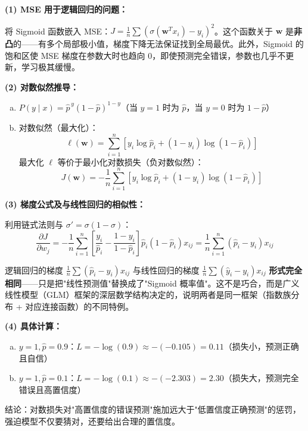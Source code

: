 \documentclass[a4paper,11pt]{ctexart}
\begin{document}
\begin{solutionbox}[参考答案与详细解析]
    \textbf{(1) MSE 用于逻辑回归的问题：}

    将 Sigmoid 函数嵌入 MSE：$J = \frac{1}{n}\sum(\sigma(\boldsymbol{w}^Tx_i)-y_i)^2$。这个函数关于 $\boldsymbol{w}$ 是\textbf{非凸}的——有多个局部极小值，梯度下降无法保证找到全局最优。此外，Sigmoid 的饱和区使 MSE 梯度在参数大时也趋向 0，即使预测完全错误，参数也几乎不更新，学习极其缓慢。

    \textbf{(2) 对数似然推导：}
    \begin{enumerate}[a.]
        \item $P(y\mid x) = \hat{p}^{\,y}(1-\hat{p})^{1-y}$（当 $y=1$ 时为 $\hat{p}$，当 $y=0$ 时为 $1-\hat{p}$）
        \item 对数似然（最大化）：
        \[
        \ell(\boldsymbol{w}) = \sum_{i=1}^n\left[y_i\log\hat{p}_i + (1-y_i)\log(1-\hat{p}_i)\right]
        \]
        最大化 $\ell$ 等价于最小化对数损失（负对数似然）：
        \[
        \boxed{J(\boldsymbol{w}) = -\frac{1}{n}\sum_{i=1}^n\left[y_i\log\hat{p}_i + (1-y_i)\log(1-\hat{p}_i)\right]}
        \]
    \end{enumerate}

    \textbf{(3) 梯度公式及与线性回归的相似性：}

    利用链式法则与 $\sigma'=\sigma(1-\sigma)$：
    \[
    \frac{\partial J}{\partial w_j} = -\frac{1}{n}\sum_{i=1}^n\left[\frac{y_i}{\hat{p}_i} - \frac{1-y_i}{1-\hat{p}_i}\right]\hat{p}_i(1-\hat{p}_i)x_{ij} = \frac{1}{n}\sum_{i=1}^n(\hat{p}_i - y_i)x_{ij}
    \]

    \begin{keybox}[惊人的相似性：逻辑回归梯度 = 线性回归梯度的形式！]
        逻辑回归的梯度 $\frac{1}{n}\sum(\hat{p}_i - y_i)x_{ij}$ 与线性回归的梯度 $\frac{1}{n}\sum(\hat{y}_i - y_i)x_{ij}$ \textbf{形式完全相同}——只是把"线性预测值"替换成了"Sigmoid 概率值"。这不是巧合，而是广义线性模型（GLM）框架的深层数学结构决定的，说明两者是同一框架（指数族分布 + 对应连接函数）的不同特例。
    \end{keybox}

    \textbf{(4) 具体计算：}
    \begin{enumerate}[a.]
        \item $y=1, \hat{p}=0.9$：$L = -\log(0.9) \approx -(-0.105) = \mathbf{0.11}$（损失小，预测正确且自信）
        \item $y=1, \hat{p}=0.1$：$L = -\log(0.1) \approx -(-2.303) = \mathbf{2.30}$（损失大，预测完全错误且高置信度）
    \end{enumerate}
    结论：对数损失对"高置信度的错误预测"施加远大于"低置信度正确预测"的惩罚，强迫模型不仅要猜对，还要给出合理的置信度。
\end{solutionbox}
\end{document}
